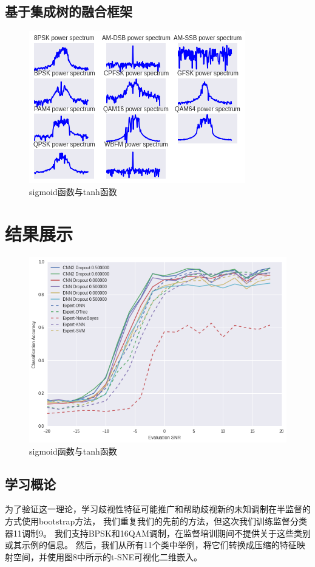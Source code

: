 \subsection{基于集成树的融合框架}
\begin{figure}[!h]
	\centering
	\includegraphics[scale=0.9]{figures/chapter_3/signal_view_2}
	\caption{sigmoid函数与tanh函数}\label{fig_2_2}
\end{figure}


\section{结果展示}

\begin{figure}[!h]
	\centering
	\includegraphics[scale=0.3]{figures/chapter_3/result}
	\caption{sigmoid函数与tanh函数}\label{fig_2_2}
\end{figure}

\subsection{学习概论}
为了验证这一理论，学习歧视性特征可能推广和帮助歧视新的未知调制在半监督的方式使用bootstrap方法，
我们重复我们的先前的方法，但这次我们训练监督分类器11调制9。
我们支持BPSK和16QAM调制，在监督培训期间不提供关于这些类别或其示例的信息。
然后，我们从所有11个类中举例，将它们转换成压缩的特征映射空间，并使用图8中所示的t-SNE可视化二维嵌入。\par

